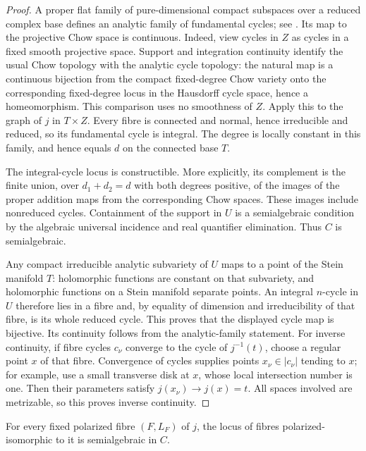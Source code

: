 \begin{proof}
A proper flat family of pure-dimensional compact subspaces over a
reduced complex base defines an analytic family of fundamental cycles;
see \cite[p.~27, Remark~(iv)]{Barlet1999}. Its map to the projective
Chow space is continuous. Indeed, view cycles in $Z$ as cycles in
a fixed smooth projective space. Support and integration continuity
\cite[\S2.4(b), Lemma~4 and \S2.5, Theorem~4]{AndreottiNorguet1967}
identify the usual Chow topology with the analytic cycle topology:
the natural map is a continuous bijection from the compact
fixed-degree Chow variety onto the corresponding fixed-degree locus
in the Hausdorff cycle space, hence a homeomorphism. This comparison
uses no smoothness of $Z$.  Apply this to the graph of
$j$ in $T\times Z$.  Every fibre is connected and normal, hence
irreducible and reduced, so its fundamental cycle is integral.  The
degree is locally constant in this family, and hence equals $d$ on
the connected base $T$.

The integral-cycle locus is constructible.  More explicitly, its
complement is the finite union, over $d_1+d_2=d$ with both degrees
positive, of the images of the proper addition maps from the
corresponding Chow spaces.  These images include nonreduced cycles.
Containment of the support in $U$ is a semialgebraic condition by the
algebraic universal incidence and real quantifier elimination.
Thus $C$ is semialgebraic.

Any compact irreducible analytic subvariety of $U$ maps to a point of
the Stein manifold $T$: holomorphic functions are constant on that
subvariety, and holomorphic functions on a Stein manifold separate
points.  An integral $n$-cycle in $U$ therefore lies in a fibre and,
by equality of dimension and irreducibility of that fibre, is its
whole reduced cycle.  This proves that the displayed cycle map is
bijective.  Its continuity follows from the analytic-family statement.
For inverse continuity, if fibre cycles $c_\nu$ converge to the cycle
of $j^{-1}(t)$, choose a regular point $x$ of that fibre.  Convergence
of cycles supplies points $x_\nu\in|c_\nu|$ tending to $x$; for
example, use a small transverse disk at $x$, whose local intersection
number is one.  Then their parameters satisfy
$j(x_\nu)\to j(x)=t$.  All spaces involved are metrizable, so this
proves inverse continuity.
\end{proof}

\begin{lemma}
\label{cmp:polarized-locus}
For every fixed polarized fibre $(F,L_F)$ of $j$, the locus of
fibres polarized-isomorphic to it is semialgebraic in $C$.
\end{lemma}


